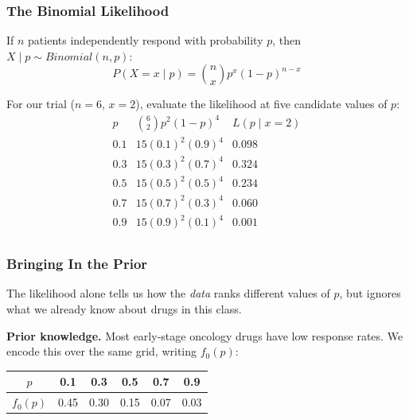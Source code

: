 \documentclass[slidestop,compress,mathserif]{beamer}
\begin{document}
\begin{frame}
    \frametitle{The Binomial Likelihood}
    If $n$ patients independently respond with probability $p$, then $X \mid p \sim Binomial(n,p)$:
    \[
    P(X=x \mid p) = \binom{n}{x}p^x(1-p)^{n-x}
    \]
    \pause

    \medskip
    For our trial ($n=6$, $x=2$), evaluate the likelihood at five candidate values of $p$:
    \[
    \renewcommand{\arraystretch}{1.2}
    \begin{array}{c|c|c}
    p & \binom{6}{2}p^2(1-p)^4 & L(p \mid x=2) \\
    \hline
    0.1 & 15(0.1)^2(0.9)^4 & 0.098 \\
    0.3 & 15(0.3)^2(0.7)^4 & 0.324 \\
    0.5 & 15(0.5)^2(0.5)^4 & 0.234 \\
    0.7 & 15(0.7)^2(0.3)^4 & 0.060 \\
    0.9 & 15(0.9)^2(0.1)^4 & 0.001 \\
    \end{array}
    \]
\end{frame}

\begin{frame}
    \frametitle{Bringing In the Prior}
    The likelihood alone tells us how the \emph{data} ranks different values of $p$, but ignores what we already know about drugs in this class.
    \pause

    \medskip
    \textbf{Prior knowledge.} Most early-stage oncology drugs have low response rates. We encode this over the same grid, writing $f_0(p)$:
    \begin{center}
    \renewcommand{\arraystretch}{1.2}
    \begin{tabular}{c|ccccc}
    \toprule
    $p$      & 0.1  & 0.3  & 0.5  & 0.7  & 0.9  \\
    \midrule
    $f_0(p)$ & 0.45 & 0.30 & 0.15 & 0.07 & 0.03 \\
    \bottomrule
    \end{tabular}
    \end{center}
\end{frame}
\end{document}
